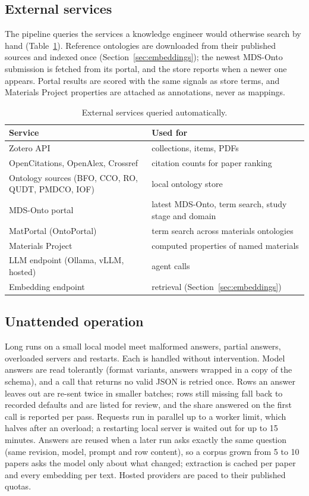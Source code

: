 \subsection{External services}

The pipeline queries the services a knowledge engineer would otherwise search by hand (Table~\ref{tab:services}). Reference ontologies are downloaded from their published sources and indexed once (Section~\ref{sec:embeddings}); the newest MDS-Onto submission is fetched from its portal, and the store reports when a newer one appears. Portal results are scored with the same signals as store terms, and Materials Project properties are attached as annotations, never as mappings.

\begin{table}[t]
\centering
\caption{External services queried automatically.}\label{tab:services}
\small
\begin{tabular}{p{2.8cm}p{4.2cm}}
\hline
Service & Used for \\
\hline
Zotero API & collections, items, PDFs \\
OpenCitations, OpenAlex, Crossref & citation counts for paper ranking \\
Ontology sources (BFO, CCO, RO, QUDT, PMDCO, IOF) & local ontology store \\
MDS-Onto portal & latest MDS-Onto, term search, study stage and domain \\
MatPortal (OntoPortal) & term search across materials ontologies \\
Materials Project & computed properties of named materials \\
LLM endpoint (Ollama, vLLM, hosted) & agent calls \\
Embedding endpoint & retrieval (Section~\ref{sec:embeddings}) \\
\hline
\end{tabular}
\end{table}

\subsection{Unattended operation}

Long runs on a small local model meet malformed answers, partial answers, overloaded servers and restarts. Each is handled without intervention. Model answers are read tolerantly (format variants, answers wrapped in a copy of the schema), and a call that returns no valid JSON is retried once. Rows an answer leaves out are re-sent twice in smaller batches; rows still missing fall back to recorded defaults and are listed for review, and the share answered on the first call is reported per pass. Requests run in parallel up to a worker limit, which halves after an overload; a restarting local server is waited out for up to 15 minutes. Answers are reused when a later run asks exactly the same question (same revision, model, prompt and row content), so a corpus grown from 5 to 10 papers asks the model only about what changed; extraction is cached per paper and every embedding per text. Hosted providers are paced to their published quotas.

